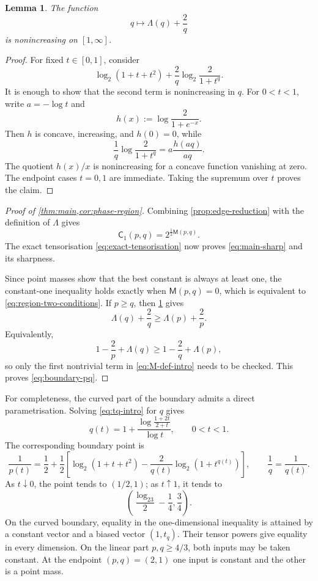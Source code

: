 \documentclass[11pt,reqno]{amsart}
\numberwithin{equation}{section}
\newtheorem{lemma}[lemma]{Lemma}
\theoremstyle{definition}
\theoremstyle{remark}
\newcommand{\Cpqr}{\mathsf C}
\newcommand{\Lambdaq}{\Lambda}
\newcommand{\Mu}{\mathsf M}
\newcommand{\logtwo}{\log_2}
\begin{document}
\begin{lemma}\label{lem:J-monotone}
The function
\[
  q\longmapsto \Lambdaq(q)+\frac2q
\]
is nonincreasing on $[1,\infty]$.
\end{lemma}

\begin{proof}
For fixed $t\in[0,1]$, consider
\[
  \logtwo(1+t+t^2)
  +\frac2q\logtwo\frac2{1+t^q}.
\]
It is enough to show that the second term is nonincreasing in $q$.  For $0<t<1$, write $a=-\log t$ and
\[
  h(x):=\log\frac2{1+e^{-x}}.
\]
Then $h$ is concave, increasing, and $h(0)=0$, while
\[
  \frac1q\log\frac2{1+t^q}
  =a\frac{h(aq)}{aq}.
\]
The quotient $h(x)/x$ is nonincreasing for a concave function vanishing at zero.  The endpoint cases $t=0,1$ are immediate.  Taking the supremum over $t$ proves the claim.
\end{proof}

\begin{proof}[Proof of \cref{thm:main,cor:phase-region}]
Combining \cref{prop:edge-reduction} with the definition of $\Lambdaq$ gives
\begin{equation}\label{eq:C1-final}
  \Cpqr_1(p,q)
  =2^{\frac12\Mu(p,q)}.
\end{equation}
The exact tensorisation \eqref{eq:exact-tensorisation} now proves \eqref{eq:main-sharp} and its sharpness.

Since point masses show that the best constant is always at least one, the constant-one inequality holds exactly when $\Mu(p,q)=0$, which is equivalent to \eqref{eq:region-two-conditions}.  If $p\ge q$, then \cref{lem:J-monotone} gives
\[
  \Lambdaq(q)+\frac2q
  \ge
  \Lambdaq(p)+\frac2p.
\]
Equivalently,
\[
  1-\frac2p+\Lambdaq(q)
  \ge
  1-\frac2q+\Lambdaq(p),
\]
so only the first nontrivial term in \eqref{eq:M-def-intro} needs to be checked.  This proves \eqref{eq:boundary-pq}.
\end{proof}

For completeness, the curved part of the boundary admits a direct parametrisation.  Solving \eqref{eq:tq-intro} for $q$ gives
\begin{equation}\label{eq:q-param}
  q(t)
  =1+
  \frac{\log\frac{1+2t}{2+t}}{\log t},
  \qquad 0<t<1.
\end{equation}
The corresponding boundary point is
\begin{equation}\label{eq:p-param}
  \frac1{p(t)}
  =\frac12+\frac12\left[
    \logtwo(1+t+t^2)
    -\frac2{q(t)}\logtwo(1+t^{q(t)})
  \right],
  \qquad
  \frac1q=\frac1{q(t)}.
\end{equation}
As $t\downarrow0$, the point tends to $(1/2,1)$; as $t\uparrow1$, it tends to
\[
  \left(\frac{\logtwo3}{2}-\frac14,\frac34\right).
\]
On the curved boundary, equality in the one-dimensional inequality is attained by a constant vector and a biased vector $(1,t_q)$.  Their tensor powers give equality in every dimension.  On the linear part $p,q\ge4/3$, both inputs may be taken constant.  At the endpoint $(p,q)=(2,1)$ one input is constant and the other is a point mass.
\end{document}
